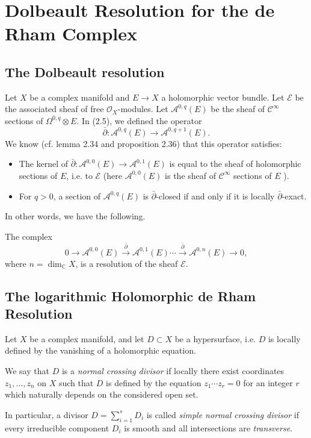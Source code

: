 \documentclass[lang=en,12pt]{beautybook}
\begin{document}
\section{Dolbeault Resolution for the de Rham Complex}

\subsection{The Dolbeault resolution}
Let $X$ be a complex manifold and $E \rightarrow X$ a holomorphic vector bundle. Let $\mathcal{E}$ be the associated sheaf of free $\mathcal{O}_X$-modules. Let $\mathcal{A}^{0, q}(E)$ be the sheaf of $\mathcal{C}^{\infty}$ sections of $\Omega^{0, q} \otimes E$. In (2.5), we defined the operator
\begin{equation*}
\bar{\partial}: \mathcal{A}^{0, q}(E) \rightarrow \mathcal{A}^{0, q+1}(E) .
\end{equation*}
We know (cf. lemma 2.34 and proposition 2.36) that this operator satisfies:
\begin{itemize}
  \item The kernel of $\bar{\partial}: \mathcal{A}^{0,0}(E) \rightarrow \mathcal{A}^{0,1}(E)$ is equal to the sheaf of holomorphic sections of $E$, i.e. to $\mathcal{E}$ (here $\mathcal{A}^{0,0}(E)$ is the sheaf of $\mathcal{C}^{\infty}$ sections of $E$ ).
  \item For $q>0$, a section of $\mathcal{A}^{0, q}(E)$ is $\bar{\partial}$-closed if and only if it is locally $\bar{\partial}$-exact. 
\end{itemize}
In other words, we have the following.
\begin{proposition}[][][prop:4.19]
  The complex
\begin{equation*}
0 \rightarrow \mathcal{A}^{0,0}(E) \stackrel{\bar{\partial}}{\rightarrow} \mathcal{A}^{0,1}(E) \cdots \stackrel{\bar{\partial}}{\rightarrow} \mathcal{A}^{0, n}(E) \rightarrow 0,
\end{equation*}
where $n=\operatorname{dim}_{\mathbb{C}} X$, is a resolution of the sheaf $\mathcal{E}$.
\end{proposition}

\subsection{The logarithmic Holomorphic de Rham Resolution}

Let $X$ be a complex manifold, and let $D \subset X$ be a hypersurface, i.e. $D$ is locally defined by the vanishing of a holomorphic equation.
\begin{definition}
  We say that $D$ is a \textit{normal crossing divisor} if locally there exist coordinates $z_1, \ldots, z_n$ on $X$ such that $D$ is defined by the equation $z_1 \cdots z_r=0$ for an integer $r$ which naturally depends on the considered open set.

  In particular, a divisor $D=\sum_{i=1}^{s}D_i$ is called \textit{simple normal crossing divisor} if every irreducible component $D_i$ is smooth and all intersections are \textit{transverse}.
\end{definition}
\end{document}
